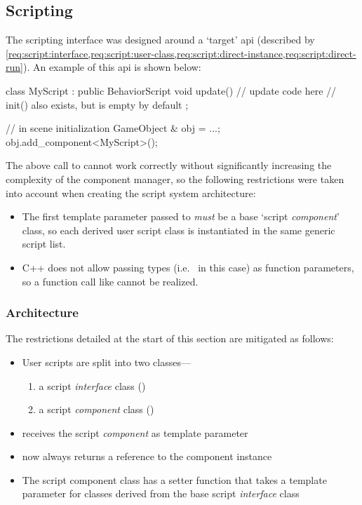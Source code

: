 \documentclass{projdoc}
\begin{document}
\subsection{Scripting}

The scripting interface was designed around a `target' \gls{api} (described by
\cref{req:script:interface,req:script:user-class,req:script:direct-instance,req:script:direct-run}).
An example of this \gls{api} is shown below:\noparbreak

\begin{blockcode}
class MyScript : public BehaviorScript {
	void update() {
		// update code here
	}
	// init() also exists, but is empty by default
};

{ // in scene initialization
	GameObject & obj = ...;
	obj.add_component<MyScript>();
}
\end{blockcode}

The above call to  cannot work correctly
without significantly increasing the complexity of the component manager, so the
following restrictions were taken into account when creating the script system
architecture:\noparbreak

\begin{itemize}
	\item The first template parameter passed to 
		\emph{must} be a base `script \emph{component}' class, so each derived user
		script class is instantiated in the same generic script list.
	\item C++ does not allow passing types (i.e.~ in this case) as
		function parameters, so a function call like
		 cannot be realized.
\end{itemize}

\subsubsection{Architecture}
\label{sec:scripts:architecture}

The restrictions detailed at the start of this section are mitigated as
follows:\noparbreak

\begin{itemize}
	\item User scripts are split into two classes---
		\begin{enumerate}
			\item a script \emph{interface} class ()
			\item a script \emph{component} class ()
		\end{enumerate}
	\item {} receives the script \emph{component}
		as template parameter
	\item {} now always returns a reference to the
		component instance
	\item The script component class has a setter function that takes a template
		parameter for classes derived from the base script \emph{interface} class
\end{itemize}
\end{document}

